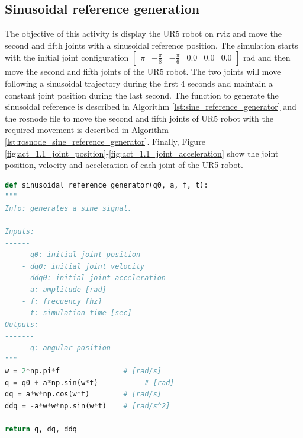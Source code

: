 \subsection{Sinusoidal reference generation}
The objective of this activity is display the UR5 robot on rviz and move the second and fifth joints with a sinusoidal reference position.  The simulation starts with the initial joint configuration $\begin{bmatrix} \pi & -\frac{\pi}{8} & -\frac{\pi}{6} & 0.0 & 0.0 & 0.0 \end{bmatrix}$ rad and then move the second and fifth joints of the UR5 robot. The two joints will move following a sinusoidal trajectory during the first 4 seconds and maintain a constant joint position during the last second. The function to generate the sinusoidal reference is described in Algorithm \ref{lst:sine_reference_generator} and the rosnode file to move the second and fifth joints of UR5 robot with the required movement is described in Algorithm \ref{lst:rosnode_sine_reference_generator}. Finally, Figure \ref{fig:act_1.1_joint_position}-\ref{fig:act_1.1_joint_acceleration} show the joint position, velocity and acceleration of each joint of the UR5 robot.\vspace{5px}
\begin{lstlisting}[language=Python,caption=Function to generate sinusoidal reference., label={lst:sine_reference_generator}]
def sinusoidal_reference_generator(q0, a, f, t):
"""
Info: generates a sine signal.

Inputs: 
------
    - q0: initial joint position
    - dq0: initial joint velocity
    - ddq0: initial joint acceleration
    - a: amplitude [rad]
    - f: frecuency [hz]
    - t: simulation time [sec]
Outputs:
-------
    - q: angular position
"""
w = 2*np.pi*f               # [rad/s]
q = q0 + a*np.sin(w*t)           # [rad]
dq = a*w*np.cos(w*t)        # [rad/s]
ddq = -a*w*w*np.sin(w*t)    # [rad/s^2]

return q, dq, ddq
\end{lstlisting}

